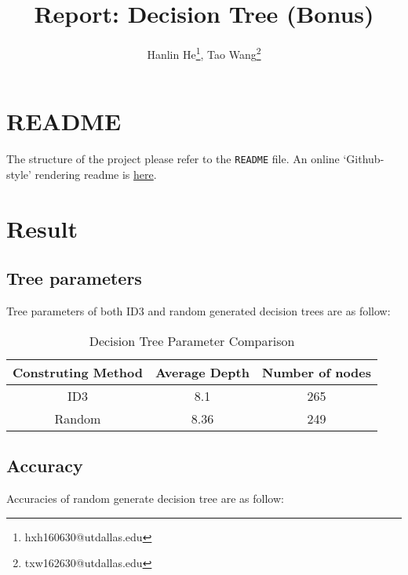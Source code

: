\documentclass[12pt, letterpaper]{article}
\title{Report: Decision Tree (Bonus)}
\author{Hanlin He\footnote{hxh160630@utdallas.edu},
Tao Wang\footnote{txw162630@utdallas.edu}}
\begin{document}
\maketitle

\section*{README}

The structure of the project please refer to the \texttt{README} file. An online `Github-style' rendering readme is \href{https://cs6375.github.io/DecisionTree/}{here}.


\section*{Result}

\subsection*{Tree parameters}

Tree parameters of both ID3 and random generated decision trees are as follow:

\begin{table}[H]
\centering
\caption{Decision Tree Parameter Comparison}\label{t1}
\begin{tabular}{ccc}\toprule
Construting Method & Average Depth & Number of nodes\\\midrule
ID3 & 8.1 & 265 \\
Random & 8.36 & 249\\\bottomrule
\end{tabular}
\end{table}

\subsection*{Accuracy}

Accuracies of random generate decision tree are as follow:

\begin{table}[H]
\centering
\caption{Random Generated Decision Tree Comparison on DataSet 1}
\end{table}
\end{document}
